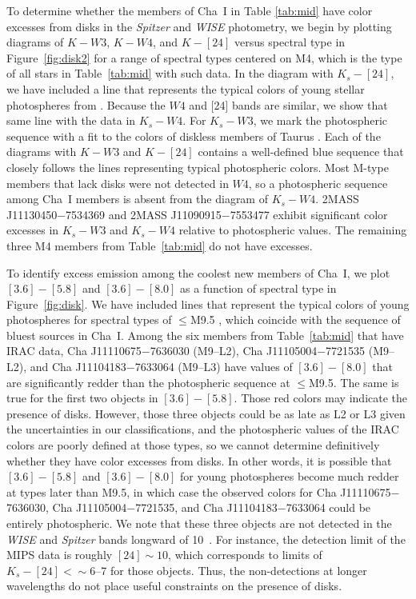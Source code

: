 \documentclass{emulateapj}
\begin{document}
To determine whether the members of Cha~I in Table \ref{tab:mid}
have color excesses from disks in the {\it Spitzer} and {\it WISE}
photometry, we begin by plotting diagrams of $K-W3$, $K-W4$, and $K-[24]$
versus spectral type in Figure~\ref{fig:disk2} for a range of spectral types
centered on M4, which is the type of all stars in Table~\ref{tab:mid}
with such data.
In the diagram with $K_s-[24]$, we have included a line that represents
the typical colors of young stellar photospheres from \citet{luh10}.
Because the $W4$ and [24] bands are similar, we show that same line
with the data in $K_s-W4$. For $K_s-W3$, we mark the photospheric sequence
with a fit to the colors of diskless members of Taurus \citep{luh10,esp14}.
Each of the diagrams with $K-W3$ and $K-[24]$ contains a well-defined blue
sequence that closely follows the lines representing typical photospheric
colors. Most M-type members that lack disks were not detected in $W4$, so a
photospheric sequence among Cha~I members is absent from the diagram of
$K_s-W4$. %
2MASS J11130450$-$7534369 and 2MASS J11090915$-$7553477 exhibit significant
color excesses in $K_s-W3$ and $K_s-W4$ relative to photospheric values.
The remaining three M4 members from Table~\ref{tab:mid} do not have excesses.

To identify excess emission among the coolest new members of Cha~I, we plot
$[3.6]-[5.8]$ and $[3.6]-[8.0]$ as a function of spectral type in
Figure~\ref{fig:disk}. %
We have included lines that represent
the typical colors of young photospheres for spectral types of $\leq$M9.5
\citep{luh10}, which coincide with the sequence of bluest sources in Cha~I. %
Among the six members from Table~\ref{tab:mid} that have IRAC data,
Cha J11110675$-$7636030 (M9--L2), Cha J11105004$-$7721535 (M9--L2), and
Cha J11104183$-$7633064 (M9--L3) have values of $[3.6]-[8.0]$ that are 
significantly redder than the photospheric sequence at $\leq$M9.5.
The same is true for the first two objects in $[3.6]-[5.8]$.
Those red colors may indicate the presence of disks.  However, those three
objects could be as late as L2 or L3 given the uncertainties
in our classifications, and the photospheric values of the IRAC colors
are poorly defined at those types, so we cannot determine definitively whether
they have color excesses from disks. In other words, it is possible that
$[3.6]-[5.8]$ and $[3.6]-[8.0]$ for young photospheres become much redder
at types later than M9.5, in which case the observed colors for
Cha J11110675$-$7636030, Cha J11105004$-$7721535, and Cha J11104183$-$7633064
could be entirely photospheric.
We note that these three objects are not detected in the {\it WISE}
and {\it Spitzer} bands longward of 10~\micron. For instance, the detection
limit of the MIPS data is roughly $[24]\sim10$, which corresponds to limits of
$K_s-[24]<\sim6$--7 for those objects. Thus, the non-detections at longer
wavelengths do not place useful constraints on the presence of disks. %
\end{document}

